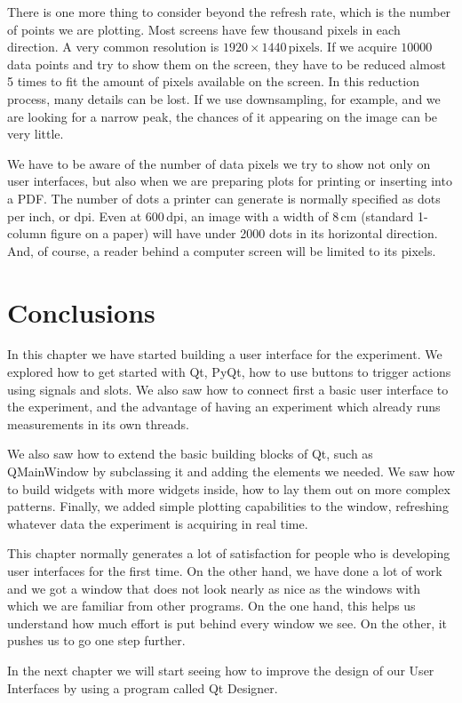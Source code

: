 There is one more thing to consider beyond the refresh rate, which is the number of points we are plotting. Most screens have few thousand pixels in each direction. A very common resolution is $1920\times1440\,\textrm{pixels}$. If we acquire $10000$ data points and try to show them on the screen, they have to be reduced almost 5 times to fit the amount of pixels available on the screen. In this reduction process, many details can be lost. If we use downsampling, for example, and we are looking for a narrow peak, the chances of it appearing on the image can be very little.

We have to be aware of the number of data pixels we try to show not only on user interfaces, but also when we are preparing plots for printing or inserting into a PDF. The number of dots a printer can generate is normally specified as dots per inch, or dpi. Even at $600\,\textrm{dpi}$, an image with a width of $8\,\textrm{cm}$ (standard 1-column figure on a paper) will have under 2000 dots in its horizontal direction. And, of course, a reader behind a computer screen will be limited to its pixels.

\section{Conclusions}\label{sec:basic-gui-conclusions}
In this chapter we have started building a user interface for the experiment. We explored how to get started with Qt, PyQt, how to use buttons to trigger actions using signals and slots. We also saw how to connect first a basic user interface to the experiment, and the advantage of having an experiment which already runs measurements in its own threads.

We also saw how to extend the basic building blocks of Qt, such as QMainWindow by subclassing it and adding the elements we needed. We saw how to build widgets with more widgets inside, how to lay them out on more complex patterns. Finally, we added simple plotting capabilities to the window, refreshing whatever data the experiment is acquiring in real time.

This chapter normally generates a lot of satisfaction for people who is developing user interfaces for the first time. On the other hand, we have done a lot of work and we got a window that does not look nearly as nice as the windows with which we are familiar from other programs. On the one hand, this helps us understand how much effort is put behind every window we see. On the other, it pushes us to go one step further.

In the next chapter we will start seeing how to improve the design of our User Interfaces by using a program called Qt Designer.
